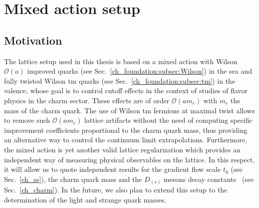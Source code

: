\chapter{Mixed action setup}%


\label{ch_ma}


\section{Motivation}
\label{ch_ma:sec:introduction}

The lattice setup used in this thesis is based on a mixed action with Wilson $\mathcal{O}(a)$ improved quarks (see Sec.~\ref{ch_foundation:subsec:Wilson}) in the sea and fully twisted Wilson tm quarks (see Sec.~\ref{ch_foundation:subsec:tm}) in the valence, whose goal is to control cutoff effects in the context of studies of flavor physics in the charm sector. These effects are of order $\mathcal{O}(am_c)$ with $m_c$ the mass of the charm quark. The use of Wilson tm fermions at maximal twist allows to remove such $\mathcal{O}(am_c)$ lattice artifacts without the need of computing specific improvement coefficients proportional to the charm quark mass, thus providing an alternative way to control the continuum limit extrapolations. Furthermore, the mixed action is yet another valid lattice regularization which provides an independent way of measuring physical observables on the lattice. In this respect, it will allow us to quote independent results for the gradient flow scale $t_0$ (see Sec.~\ref{ch_ss}), the charm quark mass and the $D_{(s)}$ mesons decay constants~\citep{charm} (see Sec.~\ref{ch_charm}). In the future, we also plan to extend this setup to the determination of the light and strange quark masses.

